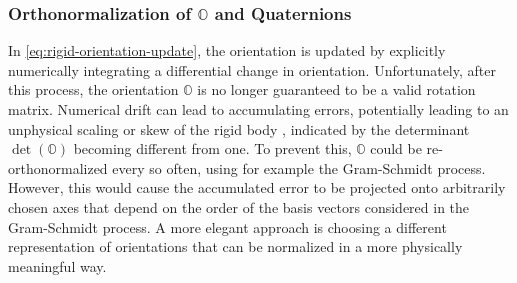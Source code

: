 \documentclass[oneside, a4paper]{book}
\newcommand\br[1]{\left(#1\right)}
\begin{document}
    \subsubsection{Orthonormalization of $\mathds{O}$ and Quaternions}
    In \autoref{eq:rigid-orientation-update}, the orientation is updated by explicitly numerically integrating a differential change in orientation. Unfortunately, after this process, the orientation $\mathds{O}$ is no longer guaranteed to be a valid rotation matrix. Numerical drift can lead to accumulating errors, potentially leading to an unphysical scaling or skew of the rigid body \autocite{physically-based-rigids}, indicated by the determinant $\det\br{\mathds{O}}$ becoming different from one. To prevent this, $\mathds{O}$ could be re-orthonormalized every so often, using for example the Gram-Schmidt process. However, this would cause the accumulated error to be projected onto arbitrarily chosen axes that depend on the order of the basis vectors considered in the Gram-Schmidt process. A more elegant approach is choosing a different representation of orientations that can be normalized in a more physically meaningful way.
\end{document}
